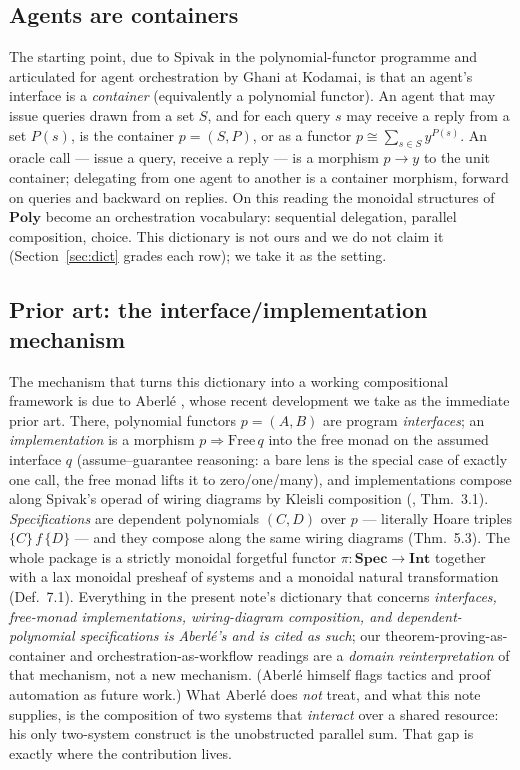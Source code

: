 \documentclass[11pt]{amsart}
\theoremstyle{definition}
\theoremstyle{remark}
\newcommand{\Poly}{\mathbf{Poly}}
\begin{document}
\subsection*{Agents are containers}
The starting point, due to Spivak in the polynomial-functor programme
\cite{NiuSpivak,SpivakRef} and articulated for agent orchestration by Ghani at Kodamai,
is that an agent's interface is a \emph{container} (equivalently a polynomial functor). An
agent that may issue queries drawn from a set $S$, and for each query $s$ may receive a
reply from a set $P(s)$, is the container $p=(S,P)$, or as a functor
$p\cong\sum_{s\in S}y^{P(s)}$. An oracle call --- issue a query, receive a reply --- is a
morphism $p\to y$ to the unit container; delegating from one agent to another is a container
morphism, forward on queries and backward on replies. On this reading the monoidal
structures of $\Poly$ become an orchestration vocabulary: sequential delegation, parallel
composition, choice. This dictionary is not ours and we do not claim it (Section~\ref{sec:dict}
grades each row); we take it as the setting.

\subsection*{Prior art: the interface/implementation mechanism}
The mechanism that turns this dictionary into a working compositional framework is due to
Aberl\'e \cite{aberle}, whose recent development we take as the immediate prior art. There,
polynomial functors $p=(A,B)$ are program \emph{interfaces}; an \emph{implementation} is a
morphism $p\Rightarrow\mathrm{Free}\,q$ into the free monad on the assumed interface $q$
(assume--guarantee reasoning: a bare lens is the special case of exactly one call, the free
monad lifts it to zero/one/many), and implementations compose along Spivak's operad of
wiring diagrams by Kleisli composition (\cite{aberle}, Thm.~3.1). \emph{Specifications} are
dependent polynomials $(C,D)$ over $p$ --- literally Hoare triples $\{C\}\,f\,\{D\}$ --- and
they compose along the same wiring diagrams (Thm.~5.3). The whole package is a strictly
monoidal forgetful functor $\pi:\mathbf{Spec}\to\mathbf{Int}$ together with a lax monoidal
presheaf of systems and a monoidal natural transformation (Def.~7.1). Everything in the
present note's dictionary that concerns \emph{interfaces, free-monad implementations,
wiring-diagram composition, and dependent-polynomial specifications is Aberl\'e's and is
cited as such}; our theorem-proving-as-container and orchestration-as-workflow readings are
a \emph{domain reinterpretation} of that mechanism, not a new mechanism. (Aberl\'e himself
flags tactics and proof automation as future work.) What Aberl\'e does \emph{not} treat, and
what this note supplies, is the composition of two systems that \emph{interact} over a shared
resource: his only two-system construct is the unobstructed parallel sum. That gap is exactly
where the contribution lives.
\end{document}
